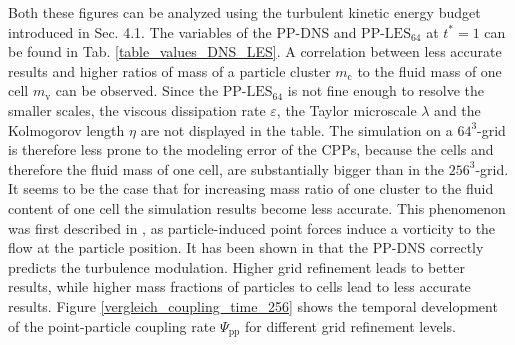 \documentclass[11pt,a4paper,openany,oneside,parskip=half*]{article}
\begin{document}
Both these figures can be analyzed using the turbulent kinetic energy budget introduced in Sec. 4.1.
\newline
The variables of the PP-DNS and PP-$\mathrm{LES_{64}}$ at $t^* = 1$ can be found in Tab. \ref{table_values_DNS_LES}. A correlation between less accurate results and higher ratios of mass of a particle cluster $m_\mathrm{c}$ to the fluid mass of one cell $m_\mathrm{v}$ can be observed. Since the PP-$\mathrm{LES_{64}}$ is not fine enough to resolve the smaller scales, the viscous dissipation rate $\varepsilon$, the Taylor microscale $\lambda$ and the Kolmogorov length $\eta$ are not displayed in the table. The simulation on a $64^3$-grid is therefore less prone to the modeling error of the CPPs, because the cells and therefore the fluid mass of one cell, are substantially bigger than in the $256^3$-grid. 
It seems to be the case that for increasing mass ratio of one cluster to the fluid content of one cell the simulation results become less accurate. This phenomenon was first described in \cite{maxey1997simulations}, as particle-induced point forces induce a vorticity to the flow at the particle position. 
\newline
It has been shown in \cite{Schneiders2016} that the PP-DNS correctly predicts the turbulence modulation. Higher grid refinement leads to better results, while higher mass fractions of particles to cells lead to less accurate results. 
Figure \ref{vergleich_coupling_time_256} shows the temporal development 
of the point-particle coupling rate $\Psi_\mathrm{pp}$ for different grid refinement levels. 
\end{document}
